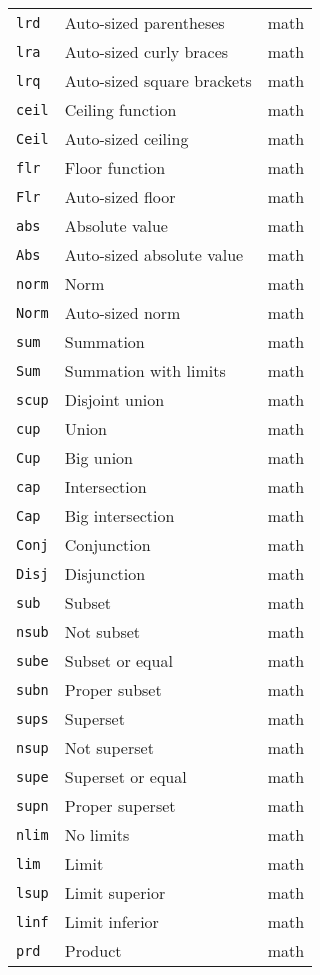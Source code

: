 \documentclass{article}
\begin{document}
\begin{longtable}{|p{}|p{}|p{}|}
\texttt{lrd} & Auto-sized parentheses & math \\
\texttt{lra} & Auto-sized curly braces & math \\
\texttt{lrq} & Auto-sized square brackets & math \\
\texttt{ceil} & Ceiling function & math \\
\texttt{Ceil} & Auto-sized ceiling & math \\
\texttt{flr} & Floor function & math \\
\texttt{Flr} & Auto-sized floor & math \\
\texttt{abs} & Absolute value & math \\
\texttt{Abs} & Auto-sized absolute value & math \\
\texttt{norm} & Norm & math \\
\texttt{Norm} & Auto-sized norm & math \\
\texttt{sum} & Summation & math \\
\texttt{Sum} & Summation with limits & math \\
\texttt{scup} & Disjoint union & math \\
\texttt{cup} & Union & math \\
\texttt{Cup} & Big union & math \\
\texttt{cap} & Intersection & math \\
\texttt{Cap} & Big intersection & math \\
\texttt{Conj} & Conjunction & math \\
\texttt{Disj} & Disjunction & math \\
\texttt{sub} & Subset & math \\
\texttt{nsub} & Not subset & math \\
\texttt{sube} & Subset or equal & math \\
\texttt{subn} & Proper subset & math \\
\texttt{sups} & Superset & math \\
\texttt{nsup} & Not superset & math \\
\texttt{supe} & Superset or equal & math \\
\texttt{supn} & Proper superset & math \\
\texttt{nlim} & No limits & math \\
\texttt{lim} & Limit & math \\
\texttt{lsup} & Limit superior & math \\
\texttt{linf} & Limit inferior & math \\
\texttt{prd} & Product & math \\

\end{longtable}
\end{document}
